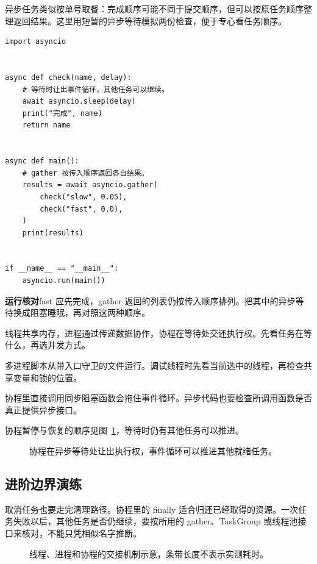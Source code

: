 异步任务类似按单号取餐：完成顺序可能不同于提交顺序，但可以按原任务顺序整理返回结果。这里用短暂的异步等待模拟两份检查，便于专心看任务顺序。

\begin{lstlisting}[title={\code{async_checks.py}}]
import asyncio


async def check(name, delay):
    # 等待时让出事件循环，其他任务可以继续。
    await asyncio.sleep(delay)
    print("完成", name)
    return name


async def main():
    # gather 按传入顺序返回各自结果。
    results = await asyncio.gather(
        check("slow", 0.05),
        check("fast", 0.0),
    )
    print(results)


if __name__ == "__main__":
    asyncio.run(main())
\end{lstlisting}

\textbf{运行核对}\enspace fast 应先完成，gather 返回的列表仍按传入顺序排列。把其中的异步等待换成阻塞睡眠，再对照这两种顺序。

\begin{myunderstanding}
线程共享内存，进程通过传递数据协作，协程在等待处交还执行权。先看任务在等什么，再选并发方式。
\end{myunderstanding}

\begin{pycharmpractice}
多进程脚本从带入口守卫的文件运行。调试线程时先看当前选中的线程，再检查共享变量和锁的位置。
\end{pycharmpractice}

\begin{pitfall}
协程里直接调用同步阻塞函数会拖住事件循环。异步代码也要检查所调用函数是否真正提供异步接口。
\end{pitfall}
协程暂停与恢复的顺序见图~\ref{fig:chapter-12-flow}，等待时仍有其他任务可以推进。
\begin{figure}[htbp]
  \centering
  \caption{协程在异步等待处让出执行权，事件循环可以推进其他就绪任务。}
  \label{fig:chapter-12-flow}
\end{figure}

\subsection*{进阶边界演练}
取消任务也要走完清理路径。协程里的 finally 适合归还已经取得的资源。一次任务失败以后，其他任务是否仍继续，要按所用的 gather、TaskGroup 或线程池接口来核对，不能只凭相似名字推断。

\begin{figure}[htbp]
\centering
{}
\caption{线程、进程和协程的交接机制示意，条带长度不表示实测耗时。}
\label{fig:visual-ch12}
\end{figure}



